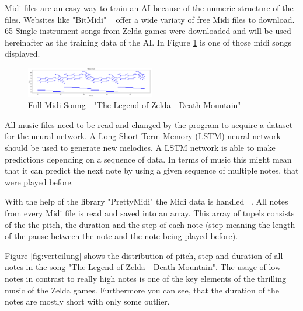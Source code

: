 Midi files are an easy way to train an AI because of the numeric structure
of the files. Websites like "BitMidi" ~\cite{noauthor_midis_nodate-1} offer a wide variaty 
of free Midi files to download. 65 Single instrument songs from Zelda games 
were downloaded and will be used hereinafter as the training data of the AI.
In Figure \ref{fig:fullSong} is one of those midi songs displayed.

\begin{figure}
\centering
\includegraphics[width=0.5\textwidth]{./pics/fullSong.PNG}
\caption{Full Midi Sonng - "The Legend of Zelda - Death Mountain"}
\label{fig:fullSong}    
\end{figure}

All music files need to be read and changed by the program to acquire
a dataset for the neural network. A Long Short-Term Memory (LSTM) neural
network should be used to generate new melodies. A LSTM network is able to 
make predictions depending on a sequence of data. In terms of music this 
might mean that it can predict the next note by using a given sequence of 
multiple notes, that were played before.

With the help of the library "PrettyMidi" the Midi data is handled ~\cite{raffel_intuitive_2014-1}. All notes
from every Midi file is read and saved into an array. This array of tupels 
consists of the the pitch, the duration and the step of each note (step meaning
the length of the pause between the note and the note being played before).

Figure \ref{fig:verteilung} shows the distribution of pitch, step and duration
of all notes in the song "The Legend of Zelda - Death Mountain". The usage of 
low notes in contrast to really high notes is one of the key elements of 
the thrilling music of the Zelda games. Furthermore you can see, that the duration of
the notes are mostly short with only some outlier. 


